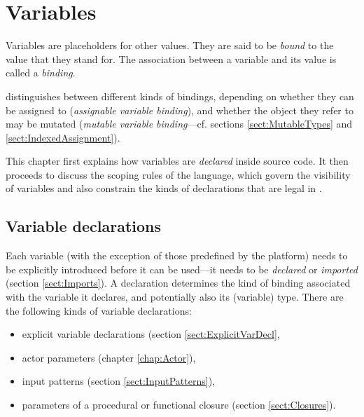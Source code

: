 

\chapter{Variables}\label{chap:Variables}



Variables are placeholders for other values. They are said to be
{\em bound} to the value that they stand for. The association between
a variable and its value is called a {\em binding}.


\Cal {}distinguishes between
different kinds of bindings, depending on whether they can be assigned
to ({\em assignable variable binding}), and whether the object they
refer to may be mutated ({\em mutable variable binding}---cf. sections
\ref{sect:MutableTypes} and \ref{sect:IndexedAssignment}).

This chapter first explains how variables are {\em declared} inside \Cal
source code. It then proceeds to discuss the scoping rules of the
language, which govern the visibility of variables and also constrain
the kinds of declarations that are legal in \Cal.


\section{Variable declarations}\label{sect:VarDecls}



Each variable (with the exception of those predefined by the platform)
needs to be explicitly introduced before it can be used---it needs to
be {\em declared} or {\em imported} (section \ref{sect:Imports}). A
declaration determines the kind of binding associated with the
variable it declares, and potentially also its (variable) type.  There
are the following kinds of variable declarations:
\begin{itemize}
\item explicit variable declarations (section \ref{sect:ExplicitVarDecl},
\item actor parameters (chapter \ref{chap:Actor}),
\item input patterns (section \ref{sect:InputPatterns}),
\item parameters of a procedural or functional closure (section \ref{sect:Closures}).
\end{itemize}

